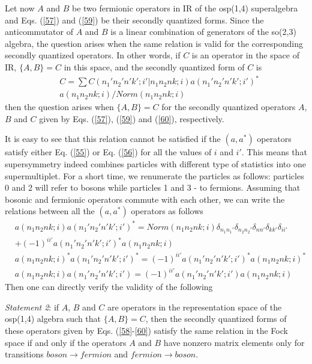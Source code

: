 \documentclass[a4paper,12pt]{article}%
\begin{document}
Let now $A$ and $B$ be two fermionic operators in IR
of the osp(1,4) superalgebra and Eqs. (\ref{57}) and
(\ref{59}) be their secondly quantized forms. Since 
the anticommutator of $A$ and $B$ is a linear combination
of generators of the so(2,3) algebra, the question
arises when the same relation is valid for the corresponding
secondly quantized operators. In other words, if $C$ is an
operator in the space of IR, $\{A,B\}=C$ in this space,
and the secondly quantized form of $C$ is
\begin{eqnarray}
&C=\sum C(n_1'n_2'n'k';i'|n_1n_2nk;i)a(n_1'n_2'n'k';i')^*\nonumber\\
&a(n_1n_2nk;i)/Norm(n_1n_2nk;i)
\label{60}
\end{eqnarray}
then the question arises when $\{A,B\}=C$ for the
secondly quantized operators $A$, $B$ and $C$ given by
Eqs. (\ref{57}), (\ref{59}) and (\ref{60}), respectively.

It is easy to see that this relation cannot be satisfied
if the $(a,a^*)$ operators satisfy either Eq. (\ref{55})
or Eq. (\ref{56}) for all the values of $i$ and $i'$.
This means that supersymmetry indeed combines 
particles with different type of statistics 
into one supermultiplet. For a short time, we renumerate 
the particles as follows: particles 0 and
2 will refer to bosons while particles 1 and 3 - to
fermions. Assuming that bosonic and fermionic operators
commute with each other, we can write the relations
between all the $(a,a^*)$ operators as follows
\begin{eqnarray}
&a(n_1n_2nk;i)a(n_1'n_2'n'k';i')^*=
Norm(n_1n_2nk;i) \delta_{n_1n_1'} 
\delta_{n_2n_2'} \delta_{nn'} \delta_{kk'} \delta_{ii'}\nonumber\\
&+(-1)^{ii'}a(n_1'n_2'n'k';i')^*a(n_1n_2nk;i)\nonumber\\
&a(n_1n_2nk;i)^*a(n_1'n_2'n'k';i')^*=
(-1)^{ii'}a(n_1'n_2'n'k';i')^*a(n_1n_2nk;i)^*\nonumber\\
&a(n_1n_2nk;i)a(n_1'n_2'n'k';i')=
(-1)^{ii'}a(n_1'n_2'n'k';i')a(n_1n_2nk;i)
\label{61}
\end{eqnarray} 
Then one can directly verify the validity of the following 

{\it Statement 2}:
if $A$, $B$ and $C$ are operators in the 
representation space of the osp(1,4) algebra such that
$\{A,B\}=C$, then the secondly quantized forms of these
operators given by Eqs. (\ref{58}-\ref{60}) satisfy the
same relation in the Fock space if and only if the 
operators $A$ and $B$ have nonzero matrix elements only for 
transitions $boson\rightarrow fermion$ and 
$fermion\rightarrow boson$.
\end{document}
